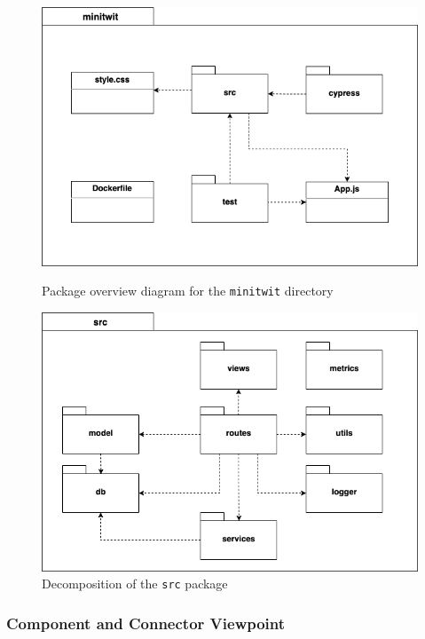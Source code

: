 \begin{figure}[H]
    \centering
    \begin{minipage}{0.45\textwidth}
        \centering
        \includegraphics[width=.95\linewidth]{images/module-minitwit.png}
        \caption{Package overview diagram for the \texttt{minitwit} directory}
        \label{fig:module-minitwit}
    \end{minipage}\hfill
    \begin{minipage}{0.45\textwidth}
        \centering
        \includegraphics[width=.95\linewidth]{images/module-src.png}
        \caption{Decomposition of the \texttt{src} package}
        \label{fig:module-src}
    \end{minipage}
\end{figure}

\subsubsection{Component and Connector Viewpoint}

